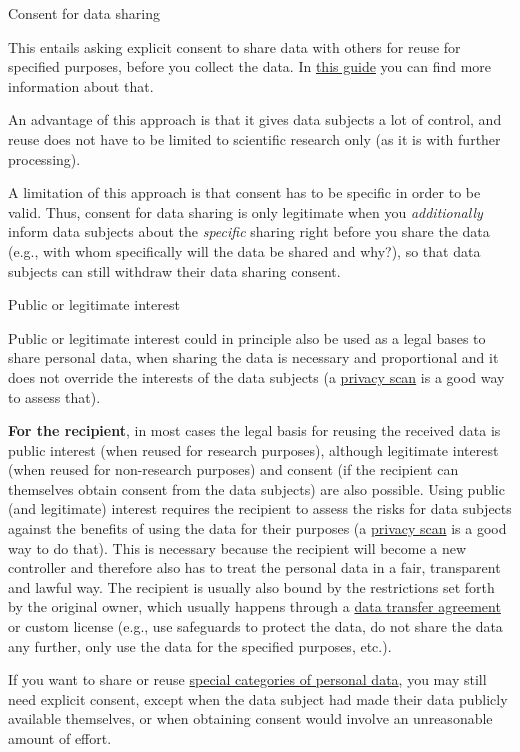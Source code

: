 \documentclass[
]{book}
\begin{document}
Consent for data sharing

This entails asking explicit consent to share data with others for reuse
for specified purposes, before you collect the data. In
\href{https://www.uu.nl/en/research/research-data-management/guides/informed-consent-for-data-sharing}{this guide}
you can find more information about that.

An advantage of this approach is that it gives data subjects a lot of
control, and reuse does not have to be limited to scientific research only
(as it is with further processing).

A limitation of this approach is that consent has to be specific in
order to be valid. Thus, consent for data sharing is only legitimate when
you \emph{additionally} inform data subjects about the \emph{specific} sharing right
before you share the data (e.g., with whom specifically will the data be
shared and why?), so that data subjects can still withdraw their data sharing
consent.

Public or legitimate interest

Public or legitimate interest could in principle also be used as a legal
bases to share personal data, when sharing the data is necessary and
proportional and it does not override the interests of the data subjects
(a \protect\hyperlink{privacy-scan}{privacy scan} is a good way to assess that).

\textbf{For the recipient}, in most cases the legal basis for reusing the received
data is public interest (when reused for research purposes), although
legitimate interest (when reused for non-research purposes) and consent (if the
recipient can themselves obtain consent from the data subjects) are also
possible. Using public (and legitimate) interest requires the recipient to
assess the risks for data subjects against the benefits of using the data for
their purposes (a \protect\hyperlink{privacy-scan}{privacy scan} is a good way to do that). This
is necessary because the recipient will become a new controller and therefore
also has to treat the personal data in a fair, transparent and lawful way. The
recipient is usually also bound by the restrictions set forth by the original
owner, which usually happens through a
\protect\hyperlink{data-transfer-agreement}{data transfer agreement} or custom license (e.g., use
safeguards to protect the data, do not share the data any further, only use the
data for the specified purposes, etc.).

If you want to share or reuse
\protect\hyperlink{special-types-personal-data}{special categories of personal data}, you may
still need explicit consent, except when the data subject had made their data
publicly available themselves, or when obtaining consent would involve an
unreasonable amount of effort.
\end{document}
